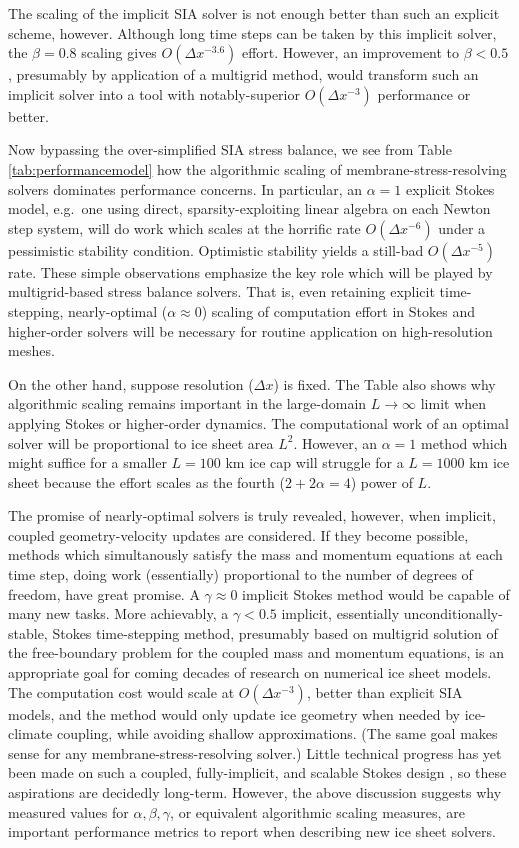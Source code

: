 \documentclass[review,letterpaper]{igs}
\begin{document}
The scaling of the \cite{Bueler2016} implicit SIA solver is not enough better than such an explicit scheme, however.  Although long time steps can be taken by this implicit solver, the $\beta=0.8$ scaling gives $O(\Delta x^{-3.6})$ effort.  However, an improvement to $\beta < 0.5$, presumably by application of a multigrid method, would transform such an implicit solver into a tool with notably-superior $O(\Delta x^{-3})$ performance or better.

Now bypassing the over-simplified SIA stress balance, we see from Table \ref{tab:performancemodel} how the algorithmic scaling of membrane-stress-resolving solvers dominates performance concerns.  In particular, an $\alpha=1$ explicit Stokes model, e.g.~one using direct, sparsity-exploiting linear algebra on each Newton step system, will do work which scales at the horrific rate $O(\Delta x^{-6})$ under a pessimistic stability condition.  Optimistic stability yields a still-bad $O(\Delta x^{-5})$ rate.  These simple observations emphasize the key role which will be played by multigrid-based stress balance solvers.  That is, even retaining explicit time-stepping, nearly-optimal ($\alpha \approx 0$) scaling of computation effort in Stokes and higher-order solvers will be necessary for routine application on high-resolution meshes.

On the other hand, suppose resolution ($\Delta x$) is fixed.  The Table also shows why algorithmic scaling remains important in the large-domain $L\to\infty$ limit when applying Stokes or higher-order dynamics.  The computational work of an optimal solver will be proportional to ice sheet area $L^2$.  However, an $\alpha=1$ method which might suffice for a smaller $L=100$ km ice cap will struggle for a $L=1000$ km ice sheet because the effort scales as the fourth ($2+2\alpha=4$) power of $L$.

The promise of nearly-optimal solvers is truly revealed, however, when implicit, coupled geometry-velocity updates are considered.  If they become possible, methods which simultanously satisfy the mass and momentum equations at each time step, doing work (essentially) proportional to the number of degrees of freedom, have great promise.  A $\gamma \approx 0$ implicit Stokes method would be capable of many new tasks.  More achievably, a $\gamma < 0.5$ implicit, essentially unconditionally-stable, Stokes time-stepping method, presumably based on multigrid solution of the free-boundary problem for the coupled mass and momentum equations, is an appropriate goal for coming decades of research on numerical ice sheet models.  The computation cost would scale at $O(\Delta x^{-3})$, better than explicit SIA models, and the method would only update ice geometry when needed by ice-climate coupling, while avoiding shallow approximations.  (The same goal makes sense for any membrane-stress-resolving solver.)  Little technical progress has yet been made on such a coupled, fully-implicit, and scalable Stokes design \cite[but see][]{WirbelJarosch2020}, so these aspirations are decidedly long-term.  However, the above discussion suggests why measured values for $\alpha,\beta,\gamma$, or equivalent algorithmic scaling measures, are important performance metrics to report when describing new ice sheet solvers.



\end{document}
